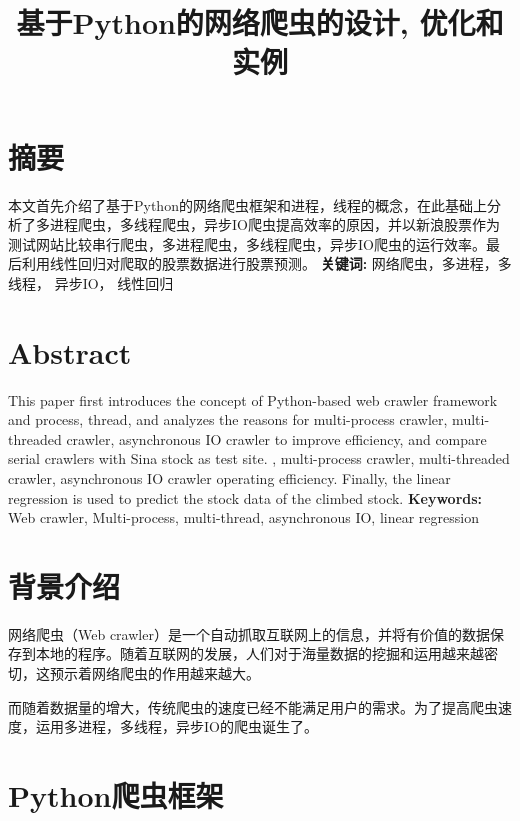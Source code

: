 \documentclass[UTF-8]{ctexart}
\date{}
\title{\begin{Large} \textbf{基于Python的网络爬虫的设计, 优化和实例}  \end{Large}}
\begin{document}
\thispagestyle{plain}
\section*{摘要}


本文首先介绍了基于Python的网络爬虫框架和进程，线程的概念，在此基础上分析了多进程爬虫，多线程爬虫，异步IO爬虫提高效率的原因，并以新浪股票作为测试网站比较串行爬虫，多进程爬虫，多线程爬虫，异步IO爬虫的运行效率。最后利用线性回归对爬取的股票数据进行股票预测。
\newline
\newline
\textbf{关键词:}
网络爬虫，多进程，多线程，  异步IO，  线性回归
\newline
\newline
\section*{Abstract}

This paper first introduces the concept of Python-based web crawler framework and process, thread, and analyzes the reasons for multi-process crawler, multi-threaded crawler, asynchronous IO crawler to improve efficiency, and compare serial crawlers with Sina stock as test site. , multi-process crawler, multi-threaded crawler, asynchronous IO crawler operating efficiency. Finally, the linear regression is used to predict the stock data of the climbed stock.
\newline
\newline
\textbf{Keywords:}
Web crawler, Multi-process, multi-thread, asynchronous IO, linear regression


\newpage
 \thispagestyle{plain}
\tableofcontents

\newpage

\section{背景介绍}
网络爬虫（Web crawler）是一个自动抓取互联网上的信息，并将有价值的数据保存到本地的程序。随着互联网的发展，人们对于海量数据的挖掘和运用越来越密切，这预示着网络爬虫的作用越来越大。

而随着数据量的增大，传统爬虫的速度已经不能满足用户的需求。为了提高爬虫速度，运用多进程，多线程，异步IO的爬虫诞生了。


\section{Python爬虫框架}
\end{document}
